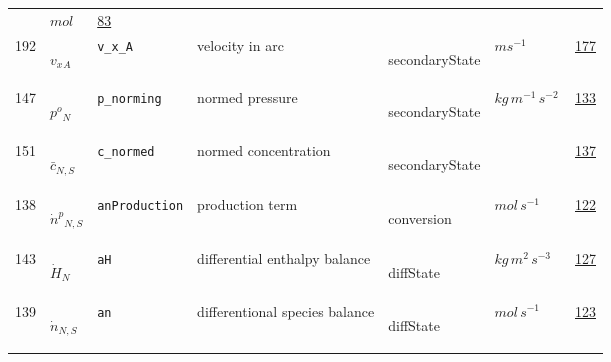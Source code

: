 \begin{longtable}{|p{1cm}|p{2.5cm}|p{4.5cm}|p{8cm}|p{3.0cm}|p{3cm}|p{1cm}|}
             & $ mol \, $
             &                 \hyperlink{"e:83"}{ 83 }
                 \\
            192
             & \hypertarget{"v:192"}{ $ {{v_x}}{_{A}} $}
             & \verb|v_x_A|
             & velocity in arc
             & \begin{lay}secondaryState \end{lay}
             & $ m s^{-1} \, $
             &                 \hyperlink{"e:177"}{ 177 }
                 \\
            147
             & \hypertarget{"v:147"}{ $ {{p^o}}{_{N}} $}
             & \verb|p_norming|
             & normed pressure
             & \begin{lay}secondaryState \end{lay}
             & $ kg \,m^{-1} \,s^{-2} \, $
             &                 \hyperlink{"e:133"}{ 133 }
                 \\
            151
             & \hypertarget{"v:151"}{ $ {{\bar{c}}}{_{N, S}} $}
             & \verb|c_normed|
             & normed concentration
             & \begin{lay}secondaryState \end{lay}
             & $  $
             &                 \hyperlink{"e:137"}{ 137 }
                 \\
            138
             & \hypertarget{"v:138"}{ $ {{\dot{n}^p}}{_{N, S}} $}
             & \verb|anProduction|
             & production term
             & \begin{lay}conversion \end{lay}
             & $ mol \,s^{-1} \, $
             &                 \hyperlink{"e:122"}{ 122 }
                 \\
            143
             & \hypertarget{"v:143"}{ $ {{\dot{H}}}{_{N}} $}
             & \verb|aH|
             & differential enthalpy balance
             & \begin{lay}diffState \end{lay}
             & $ kg \,m^{2} \,s^{-3} \, $
             &                 \hyperlink{"e:127"}{ 127 }
                 \\
            139
             & \hypertarget{"v:139"}{ $ {{\dot{n}}}{_{N, S}} $}
             & \verb|an|
             & differentional species balance
             & \begin{lay}diffState \end{lay}
             & $ mol \,s^{-1} \, $
             &                 \hyperlink{"e:123"}{ 123 }
                 \\
    \end{longtable}